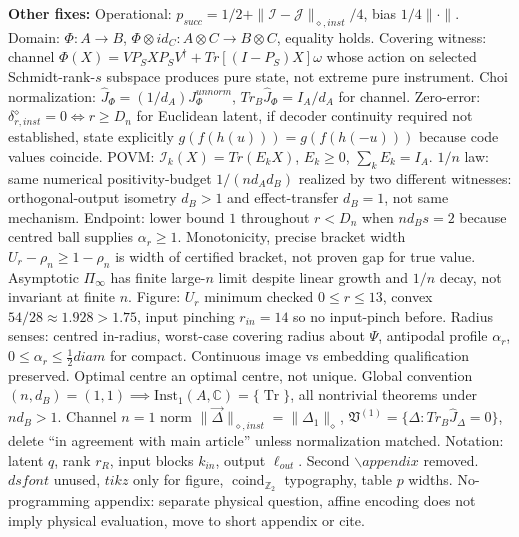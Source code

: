 \documentclass[11pt,a4paper]{article}
\newcommand{\Inst}{\mathrm{Inst}}
\newcommand{\Tr}{\operatorname{Tr}}
\newcommand{\coind}{\operatorname{coind}_{\mathbb Z_2}}
\begin{document}
\textbf{Other fixes:}
Operational: $p_{succ}=1/2+\|\mathcal I-\mathcal J\|_{\diamond,inst}/4$, bias $1/4\|\cdot\|$.
Domain: $\Phi:A\to B$, $\Phi\otimes id_C:A\otimes C\to B\otimes C$, equality holds.
Covering witness: channel $\Phi(X)=VP_SXP_SV^\dagger+Tr[(I-P_S)X]\omega$ whose action on selected Schmidt-rank-$s$ subspace produces pure state, not extreme pure instrument.
Choi normalization: $\widehat J_\Phi=(1/d_A)J^{unnorm}_\Phi$, $Tr_B\widehat J_\Phi=I_A/d_A$ for channel.
Zero-error: $\delta_{r,inst}^\diamond=0\iff r\ge D_n$ for Euclidean latent, if decoder continuity required not established, state explicitly $g(f(h(u)))=g(f(h(-u)))$ because code values coincide.
POVM: $\mathcal I_k(X)=Tr(E_kX)$, $E_k\ge0$, $\sum_kE_k=I_A$.
$1/n$ law: same numerical positivity-budget $1/(nd_Ad_B)$ realized by two different witnesses: orthogonal-output isometry $d_B>1$ and effect-transfer $d_B=1$, not same mechanism.
Endpoint: lower bound $1$ throughout $r<D_n$ when $nd_Bs=2$ because centred ball supplies $\alpha_r\ge1$.
Monotonicity, precise bracket width $U_r-\rho_n\ge1-\rho_n$ is width of certified bracket, not proven gap for true value.
Asymptotic $\Pi_\infty$ has finite large-$n$ limit despite linear growth and $1/n$ decay, not invariant at finite $n$.
Figure: $U_r$ minimum checked $0\le r\le13$, convex $54/28\approx1.928>1.75$, input pinching $r_{in}=14$ so no input-pinch before.
Radius senses: centred in-radius, worst-case covering radius about $\Psi$, antipodal profile $\alpha_r$, $0\le\alpha_r\le\frac12diam$ for compact.
Continuous image vs embedding qualification preserved.
Optimal centre an optimal centre, not unique.
Global convention $(n,d_B)=(1,1)\implies\Inst_1(A,\mathbb C)=\{\Tr\}$, all nontrivial theorems under $nd_B>1$.
Channel $n=1$ norm $\|\vec\Delta\|_{\diamond,inst}=\|\Delta_1\|_\diamond$, $\mathfrak V^{(1)}=\{\Delta:Tr_B\widehat J_\Delta=0\}$, delete ``in agreement with main article'' unless normalization matched.
Notation: latent $q$, rank $r_R$, input blocks $k_{in}$, output $\ell_{out}$.
Second $\backslash appendix$ removed.
$dsfont$ unused, $tikz$ only for figure, $\coind$ typography, table $p{}$ widths.
No-programming appendix: separate physical question, affine encoding does not imply physical evaluation, move to short appendix or cite.
\end{document}
